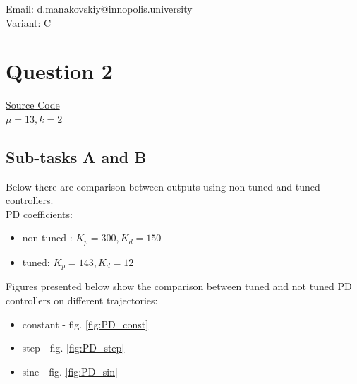 \documentclass[12pt,letterpaper]{article}
\begin{document}
Email: d.manakovskiy@innopolis.university \\
Variant: C
\section*{Question 2}
\label{Q:2}
\href{https://colab.research.google.com/drive/1xW-0uvQt3TUTCuMd2QIX7PrRyjHfzSiD}{Source Code} \\
$\mu = 13, k = 2$
\subsection*{Sub-tasks A and B}
    Below there are comparison between outputs using non-tuned and tuned controllers.\\
    PD coefficients:
    \begin{itemize}
        \item non-tuned : $K_p = 300, K_d = 150$
        \item tuned: $K_p = 143, K_d = 12$
   \end{itemize}
    
    Figures presented below show the comparison between tuned and not tuned PD controllers on different trajectories:
    \begin{itemize}
        \item constant - fig.   \ref{fig:PD_const}
        \item step - fig.       \ref{fig:PD_step}
        \item sine - fig.       \ref{fig:PD_sin} 
    \end{itemize}
    
\end{document}
